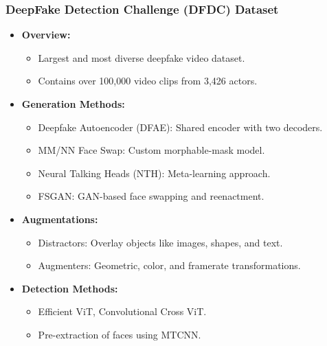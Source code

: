 \documentclass{beamer}
\begin{document}
\begin{frame}
    \frametitle{DeepFake Detection Challenge (DFDC) Dataset}
    \begin{itemize}
        \item \textbf{Overview:}
            \begin{itemize}
                \item Largest and most diverse deepfake video dataset.
                \item Contains over 100,000 video clips from 3,426 actors.
            \end{itemize}
        \item \textbf{Generation Methods:}
            \begin{itemize}
                \item Deepfake Autoencoder (DFAE): Shared encoder with two decoders.
                \item MM/NN Face Swap: Custom morphable-mask model.
                \item Neural Talking Heads (NTH): Meta-learning approach.
                \item FSGAN: GAN-based face swapping and reenactment.
            \end{itemize}
        \item \textbf{Augmentations:}
            \begin{itemize}
                \item Distractors: Overlay objects like images, shapes, and text.
                \item Augmenters: Geometric, color, and framerate transformations.
            \end{itemize}
        \item \textbf{Detection Methods:}
            \begin{itemize}
                \item Efficient ViT, Convolutional Cross ViT.
                \item Pre-extraction of faces using MTCNN.
            \end{itemize}
    \end{itemize}
\end{frame}
\end{document}
